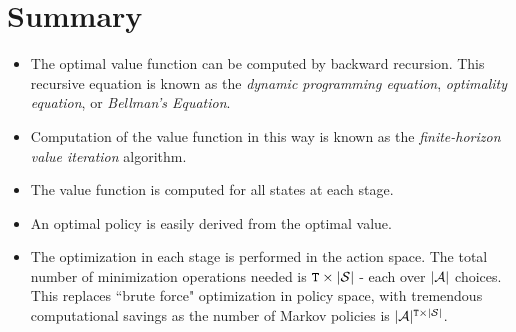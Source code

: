 \section{Summary}
\begin{itemize}
  \item The optimal value function can be computed by backward recursion. This recursive equation is known as the \emph{dynamic programming equation}, \emph{optimality equation}, or \emph{Bellman's Equation}.
  \item Computation of the value function in this way is known as the \emph{finite-horizon value iteration} algorithm.
  \item The value function is computed for all states at each stage.
  \item An optimal policy is easily derived from the optimal value.
  \item The optimization in each stage is performed in the action space.  The total number of minimization operations needed is ${\tt T} \times |\mathcal{S}|$  - each over $|\mathcal{A}|$ choices. This replaces ``brute force" optimization in policy space, with tremendous computational savings as the number of Markov policies is $|\mathcal{A}{|^{{\tt T}\times |\mathcal{S}|}}$.
\end{itemize}

